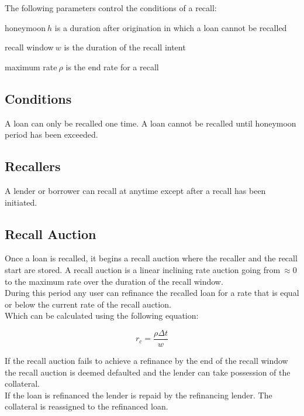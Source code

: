 \documentclass[12pt]{article}
\begin{document}
The following parameters control the conditions of a recall:
\itemize
\item honeymoon$\ h$ is a duration after origination in which a loan cannot be recalled
\item recall window$\ w$ is the duration of the recall intent
\item maximum rate$\ \rho$ is the end rate for a recall

\subsection{Conditions}
A loan can only be recalled one time. A loan cannot be recalled until honeymoon period has been exceeded.

\subsection{Recallers}
A lender or borrower can recall at anytime except after a recall has been initiated.

\subsection{Recall Auction}

Once a loan is recalled, it begins a recall auction where the recaller and the recall start are stored. A recall auction is a linear inclining rate auction going from$\ \approx0$ to the maximum rate over the duration of the recall window.\\

During this period any user can refinance the recalled loan for a rate that is equal or below the current rate of the recall auction.\\

Which can be calculated using the following equation:

$$
 r_c = \frac{\rho \Delta t}{w}
$$

If the recall auction fails to achieve a refinance by the end of the recall window the recall auction is deemed defaulted and the lender can take possession of the collateral.\\

If the loan is refinanced the lender is repaid by the refinancing lender. The collateral is reassigned to the refinanced loan.
\end{document}
